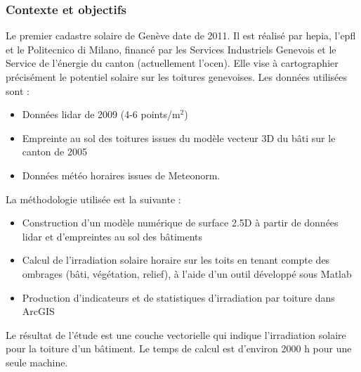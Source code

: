 \subsubsection{Contexte et objectifs}
\par{Le premier cadastre solaire de Genève \cite{desthieux_etude_2011} date de 2011. Il est réalisé par \acrshort{hepia}, l'\acrshort{epfl} et le Politecnico di Milano, financé par les Services Industriels Genevois et le Service de l'énergie du canton (actuellement l'\acrshort{ocen}). Elle vise à cartographier précisément le potentiel solaire sur les toitures genevoises. Les données utilisées sont :}
\begin{itemize}
    \item Données \gls{lidar} de 2009 (4-6 points/m$^2$)
    \item Empreinte au sol des toitures issues du modèle vecteur 3D du bâti sur le canton de 2005
    \item Données météo horaires issues de Meteonorm.
\end{itemize}
La méthodologie utilisée est la suivante :
\begin{itemize}
    \item Construction d'un modèle numérique de surface 2.5D à partir de données \gls{lidar} et d'empreintes au sol des bâtiments
    \item Calcul de l'irradiation solaire horaire sur les toits en tenant compte des ombrages (bâti, végétation, relief), à l'aide d'un outil développé sous Matlab
    \item Production d'indicateurs et de statistiques d'irradiation par toiture dans ArcGIS
\end{itemize}
\par{Le résultat de l'étude est une couche vectorielle qui indique l'irradiation solaire pour la toiture d'un bâtiment. Le temps de calcul est d'environ 2000 h pour une seule machine.}

